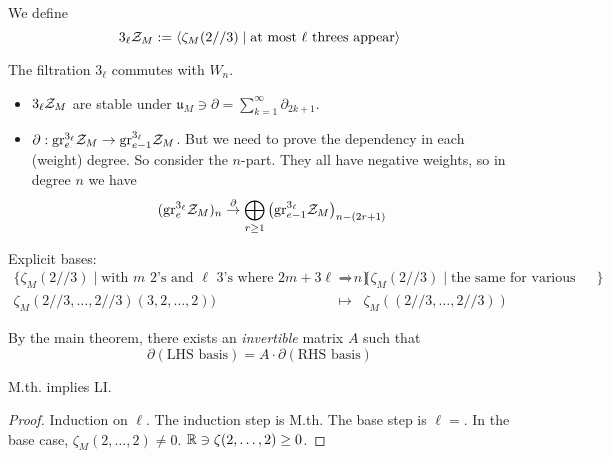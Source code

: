 \begin{defn}
We define
\[
3_{\ell} \mathcal{Z}_M := \langle \zeta_M(2 //3) \mid \textrm{at most $\ell$ threes appear} \rangle
\]
\end{defn}

\begin{rem} 
The filtration $3_{\ell}$ commutes with $W_n$.
\end{rem}

\begin{itemize}
\item $3_{\ell} \mathcal{Z}_M$ are stable under $\mathfrak{u}_M \ni \partial = \sum_{k=1}^{\infty} \partial_{2k+1}$.
\item $\partial : \mathrm{gr}^{3_{\ell}}_e \mathcal{Z}_M \to \mathrm{gr}^{3_{\ell}}_{e-1} \mathcal{Z}_M$. But we need to prove the dependency in each (weight) degree. So consider the $n$-part. They all have negative weights, so in degree $n$ we have
\[
(\mathrm{gr}^{3_{\ell}}_e \mathcal{Z}_M)_n \stackrel{\partial}{\to} \bigoplus_{r \geq 1} \left(\mathrm{gr}_{e-1}^{3_{\ell}} \mathcal{Z}_M\right)_{n-(2r+1)}
\]
\end{itemize}

Explicit bases: 
\[
\begin{array}{rcl}
\{ \zeta_M(2 //3) \mid \textrm{with $m$ 2's and $\ell$ 3's where $2m+3\ell = n$} \} & \to & \{ \zeta_M(2//3) \mid \textrm{the same for various weights} \} \\
\zeta_M(2//3, \ldots, 2//3)(3,2, \ldots,2)) & \mapsto & \zeta_M((2//3, \ldots, 2//3))
\end{array}
\]

By the main theorem, there exists an \emph{invertible} matrix $A$ such that
\[
\partial(\textrm{LHS basis}) = A \cdot \partial(\textrm{RHS basis})
\]

\begin{prop}
M.th. implies LI.
\end{prop}
\begin{proof}
Induction on $\ell$. The induction step is M.th. The base step is $\ell = $. In the base case, $\zeta_M(2, \ldots, 2) \neq 0$. $\mathbb{R} \ni \zeta(2,\ldots, 2) \geq 0$.
\end{proof}

